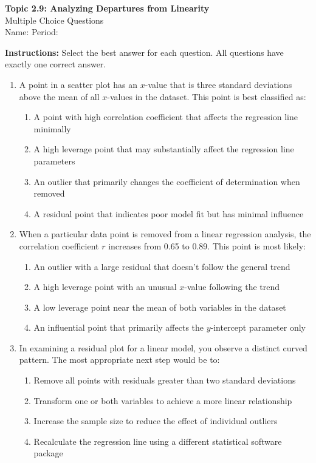 \documentclass[11pt]{article}
\begin{document}
\begin{center}
{\Large \textbf{Topic 2.9: Analyzing Departures from Linearity}}\\[0.5em]
{\large Multiple Choice Questions}\\[1em]
Name: \underline{\hspace{3in}} \quad Period: \underline{\hspace{1in}}
\end{center}

\textbf{Instructions:} Select the best answer for each question. All questions have exactly one correct answer.

\begin{enumerate}

\item A point in a scatter plot has an $x$-value that is three standard deviations above the mean of all $x$-values in the dataset. This point is best classified as:
\begin{enumerate}[label=(\Alph*)]
\item A point with high correlation coefficient that affects the regression line minimally
\item A high leverage point that may substantially affect the regression line parameters
\item An outlier that primarily changes the coefficient of determination when removed
\item A residual point that indicates poor model fit but has minimal influence
\end{enumerate}

\item When a particular data point is removed from a linear regression analysis, the correlation coefficient $r$ increases from 0.65 to 0.89. This point is most likely:
\begin{enumerate}[label=(\Alph*)]
\item An outlier with a large residual that doesn't follow the general trend
\item A high leverage point with an unusual $x$-value following the trend
\item A low leverage point near the mean of both variables in the dataset
\item An influential point that primarily affects the $y$-intercept parameter only
\end{enumerate}

\item In examining a residual plot for a linear model, you observe a distinct curved pattern. The most appropriate next step would be to:
\begin{enumerate}[label=(\Alph*)]
\item Remove all points with residuals greater than two standard deviations
\item Transform one or both variables to achieve a more linear relationship
\item Increase the sample size to reduce the effect of individual outliers
\item Recalculate the regression line using a different statistical software package
\end{enumerate}


\end{enumerate}
\end{document}

